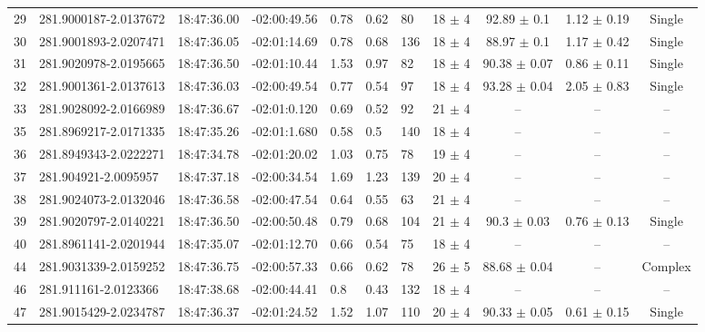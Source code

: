 \begin{table}[htp]
\begin{tabular}{llllllllccc}
29  &  281.9000187-2.0137672  &  18:47:36.00  &  -02:00:49.56  &  0.78  &  0.62  &  80  &  18 $\pm$ 4  &  92.89 $\pm$ 0.1  &  1.12 $\pm$ 0.19  &  Single \\
30  &  281.9001893-2.0207471  &  18:47:36.05  &  -02:01:14.69  &  0.78  &  0.68  &  136  &  18 $\pm$ 4  &  88.97 $\pm$ 0.1  &  1.17 $\pm$ 0.42  &  Single \\
31  &  281.9020978-2.0195665  &  18:47:36.50  &  -02:01:10.44  &  1.53  &  0.97  &  82  &  18 $\pm$ 4  &  90.38 $\pm$ 0.07  &  0.86 $\pm$ 0.11  &  Single \\
32  &  281.9001361-2.0137613  &  18:47:36.03  &  -02:00:49.54  &  0.77  &  0.54  &  97  &  18 $\pm$ 4  &  93.28 $\pm$ 0.04  &  2.05 $\pm$ 0.83  &  Single \\
33  &  281.9028092-2.0166989  &  18:47:36.67  &  -02:01:0.120  &  0.69  &  0.52  &  92  &  21 $\pm$ 4  &  --  &  --  &  -- \\
35  &  281.8969217-2.0171335  &  18:47:35.26  &  -02:01:1.680  &  0.58  &  0.5  &  140  &  18 $\pm$ 4  &  --  &  --  &  -- \\
36  &  281.8949343-2.0222271  &  18:47:34.78  &  -02:01:20.02  &  1.03  &  0.75  &  78  &  19 $\pm$ 4  &  --  &  --  &  -- \\
37  &  281.904921-2.0095957  &  18:47:37.18  &  -02:00:34.54  &  1.69  &  1.23  &  139  &  20 $\pm$ 4  &  --  &  --  &  -- \\
38  &  281.9024073-2.0132046  &  18:47:36.58  &  -02:00:47.54  &  0.64  &  0.55  &  63  &  21 $\pm$ 4  &  --  &  --  &  -- \\
39  &  281.9020797-2.0140221  &  18:47:36.50  &  -02:00:50.48  &  0.79  &  0.68  &  104  &  21 $\pm$ 4  &  90.3 $\pm$ 0.03  &  0.76 $\pm$ 0.13  &  Single \\
40  &  281.8961141-2.0201944  &  18:47:35.07  &  -02:01:12.70  &  0.66  &  0.54  &  75  &  18 $\pm$ 4  &  --  &  --  &  -- \\
44  &  281.9031339-2.0159252  &  18:47:36.75  &  -02:00:57.33  &  0.66  &  0.62  &  78  &  26 $\pm$ 5  &  88.68 $\pm$ 0.04  &  --  &  Complex \\
46  &  281.911161-2.0123366  &  18:47:38.68  &  -02:00:44.41  &  0.8  &  0.43  &  132  &  18 $\pm$ 4  &  --  &  --  &  -- \\
47  &  281.9015429-2.0234787  &  18:47:36.37  &  -02:01:24.52  &  1.52  &  1.07  &  110  &  20 $\pm$ 4  &  90.33 $\pm$ 0.05  &  0.61 $\pm$ 0.15  &  Single \\
\hline
\end{tabular}
\end{table}

